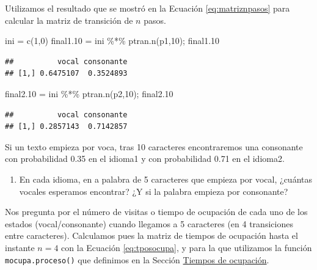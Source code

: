 \documentclass[
]{book}
\newenvironment{Shaded}{\begin{snugshade}}{\end{snugshade}}
\newcommand{\DecValTok}[1]{\textcolor[rgb]{0.00,0.00,0.81}{#1}}
\newcommand{\FloatTok}[1]{\textcolor[rgb]{0.00,0.00,0.81}{#1}}
\newcommand{\FunctionTok}[1]{\textcolor[rgb]{0.00,0.00,0.00}{#1}}
\newcommand{\NormalTok}[1]{#1}
\newcommand{\OtherTok}[1]{\textcolor[rgb]{0.56,0.35,0.01}{#1}}
\newcommand{\SpecialCharTok}[1]{\textcolor[rgb]{0.00,0.00,0.00}{#1}}
\providecommand{\tightlist}{%
  \setlength{\itemsep}{0pt}\setlength{\parskip}{0pt}}
\theoremstyle{definition}
\theoremstyle{definition}
\theoremstyle{definition}
\theoremstyle{definition}
\theoremstyle{remark}
\begin{document}
Utilizamos el resultado que se mostró en la Ecuación \eqref{eq:matriznpasos} para calcular la matriz de transición de \(n\) pasos.

\begin{Shaded}
\begin{Highlighting}[]
\NormalTok{ini }\OtherTok{=} \FunctionTok{c}\NormalTok{(}\DecValTok{1}\NormalTok{,}\DecValTok{0}\NormalTok{)}
\NormalTok{final1}\FloatTok{.10} \OtherTok{=}\NormalTok{ ini }\SpecialCharTok{\%*\%} \FunctionTok{ptran.n}\NormalTok{(p1,}\DecValTok{10}\NormalTok{); final1}\FloatTok{.10}
\end{Highlighting}
\end{Shaded}

\begin{verbatim}
##          vocal consonante
## [1,] 0.6475107  0.3524893
\end{verbatim}

\begin{Shaded}
\begin{Highlighting}[]
\NormalTok{final2}\FloatTok{.10} \OtherTok{=}\NormalTok{ ini }\SpecialCharTok{\%*\%} \FunctionTok{ptran.n}\NormalTok{(p2,}\DecValTok{10}\NormalTok{); final2}\FloatTok{.10}
\end{Highlighting}
\end{Shaded}

\begin{verbatim}
##          vocal consonante
## [1,] 0.2857143  0.7142857
\end{verbatim}

Si un texto empieza por voca, tras 10 caracteres encontraremos una consonante con probabilidad 0.35 en el idioma1 y con probabilidad 0.71 en el idioma2.

\begin{enumerate}
\def\labelenumi{\arabic{enumi}.}
\setcounter{enumi}{2}
\tightlist
\item
  En cada idioma, en a palabra de 5 caracteres que empieza por vocal, ¿cuántas vocales esperamos encontrar? ¿Y si la palabra empieza por consonante?
\end{enumerate}

Nos pregunta por el número de visitas o tiempo de ocupación de cada uno de los estados (vocal/consonante) cuando llegamos a 5 caracteres (en 4 transiciones entre caracteres). Calculamos pues la matriz de tiempos de ocupación hasta el instante \(n=4\) con la Ecuación \eqref{eq:tposocupa}, y para la que utilizamos la función \texttt{mocupa.proceso()} que definimos en la Sección \href{tiemposocupa-sec}{Tiempos de ocupación}.
\end{document}
